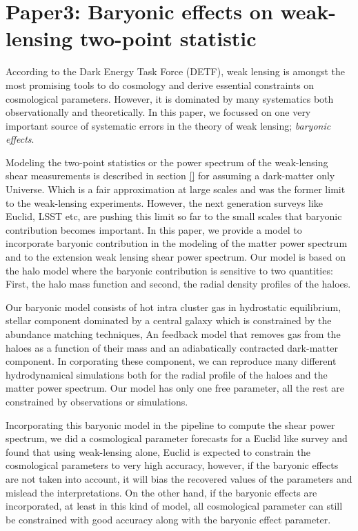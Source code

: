 \chapter{Paper3: Baryonic effects on weak-lensing two-point statistic}\label{paper:baryoniceffects}

According to the Dark Energy Task Force (DETF), weak lensing is amongst the most promising
tools to do cosmology and derive essential constraints on cosmological parameters. 
However, it is dominated by many systematics both observationally and theoretically.
In this paper, we focussed on one very important source of systematic errors in the 
theory of weak lensing; {\it baryonic effects}. 

Modeling the two-point statistics or the power spectrum of the weak-lensing shear measurements
is described in section \ref{} for assuming a dark-matter only Universe. Which is a fair approximation
at large scales and was the former limit to the weak-lensing experiments. However, the next
generation surveys like Euclid, LSST etc, are pushing this limit so far to the small scales
that baryonic contribution becomes important. In this paper, we provide a model
to incorporate baryonic contribution in the modeling of the matter power spectrum
and to the extension weak lensing shear power spectrum. Our model is based on 
the halo model where the baryonic contribution is sensitive to two quantities: 
First, the halo mass function and second, the radial density profiles of the haloes.

Our baryonic model consists of hot intra cluster gas in hydrostatic equilibrium, 
stellar component dominated by a central galaxy which is constrained by the abundance
matching techniques, An feedback model that removes gas from the haloes as a function
of their mass and an adiabatically contracted dark-matter component. In corporating
these component, we can reproduce many different hydrodynamical simulations both
for the radial profile of the haloes and the matter power spectrum. Our model has only
one free parameter, all the rest are constrained by observations or simulations. 

Incorporating this baryonic model in the pipeline to compute the shear power spectrum, 
we did a cosmological parameter forecasts for a Euclid like survey and found that using
weak-lensing alone, Euclid is expected to constrain the cosmological parameters to very
high accuracy, however, if the baryonic effects are not taken into account, it will bias
the recovered values of the parameters and mislead the interpretations. On the other hand,
if the baryonic effects are incorporated, at least in this kind of model, all cosmological
parameter can still be constrained with good accuracy along with the baryonic effect
parameter. 




\clearpage
